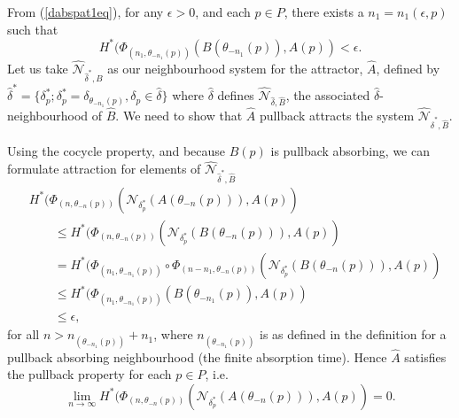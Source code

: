 \begin{prf}
  From (\ref{dabspat1eq}), for any $\epsilon > 0$, and each $p \in P$, there
  exists a $n_1 = n_1(\epsilon,p)$ such that
  \[ H^*(\Phi_{(n_1,\theta_{-n_1}(p))}
           (B(\theta_{-n_1}(p)),A(p)) < \epsilon. \]
  Let us take $\hat{\mathcal{N}}_{\hat{\delta}^*,\hat{B}}$ as our
  neighbourhood system for the attractor, $\hat{A}$, defined by
  $\hat{\delta}^* = \{ \delta^*_p; \delta^*_p =
  \delta_{\theta_{-n_1}(p)}, \delta_p \in \hat{\delta} \}$
  where $\hat{\delta}$ defines $\hat{\mathcal{N}}_{\hat{\delta}, \hat{B}}$,
  the associated $\hat{\delta}$-neighbourhood of $\hat{B}$. We need to show
  that $\hat{A}$ pullback attracts the system
  $\hat{\mathcal{N}}_{\hat{\delta}^*,\hat{B}}$.

  Using the cocycle property, and because $B(p)$ is pullback absorbing, we
  can formulate attraction for elements of
  $\hat{\mathcal{N}}_{\hat{\delta}^*,\hat{B}}$
  \begin{equation*}
  \begin{split}
  &H^*(\Phi_{(n,
  \theta_{-n}(p))}(\mathcal{N}_{\delta^*_p}(A(\theta_{-n}(p))),A(p)) \\
  &\qquad \leq H^*(\Phi_{(n,
  \theta_{-n}(p))}(\mathcal{N}_{\delta^*_p}(B(\theta_{-n}(p))),A(p)) \\
  &\qquad = H^*(\Phi_{(n_1, \theta_{-n_1}(p))}
          \circ \Phi_{(n-n_1,
          \theta_{-n}(p))}
          (\mathcal{N}_{\delta^*_p}(B(\theta_{-n}(p))),A(p)) \\
  &\qquad \leq H^*(\Phi_{(n_1, \theta_{-n_1}(p))}
          (B(\theta_{-n_1}(p)),A(p)) \\
  &\qquad \leq \epsilon,
  \end{split}
  \end{equation*}
  for all $n > n_{(\theta_{-n_1}(p))} +n_1$, where
  $n_{(\theta_{-n_1}(p))}$ is as defined in the definition for
  a pullback absorbing neighbourhood (the finite absorption time).
  Hence $\hat{A}$ satisfies the pullback property for each $p \in P$, i.e.
  \[ \lim_{n \to \infty} H^* (\Phi_{(n, \theta_{-n}(p))}
            (\mathcal{N}_{\delta^*_p}(A(\theta_{-n}(p))),A(p)) = 0. \]


\end{prf}
